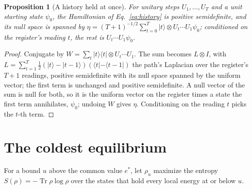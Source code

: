 \documentclass[aps,prd,reprint,superscriptaddress]{revtex4-2}
\newtheorem{proposition}{Proposition}
\begin{document}
\begin{proposition}[A history held at once]\label{prop:history}
For unitary steps $U_1, \dots, U_T$ and a unit starting state $\psi_0$, the Hamiltonian of Eq.~\eqref{eq:history} is positive semidefinite, and its null space is spanned by $\eta = (T+1)^{-1/2} \sum_{t=0}^{T} |t\rangle \otimes U_t \cdots U_1 \psi_0$; conditioned on the register's reading $t$, the rest is $U_t \cdots U_1 \psi_0$.
\end{proposition}
\begin{proof}
Conjugate by $W = \sum_t |t\rangle\langle t| \otimes U_t \cdots U_1$. The sum becomes $L \otimes I$, with $L = \sum_{t=1}^{T} \tfrac12 (|t\rangle - |t{-}1\rangle)(\langle t| - \langle t{-}1|)$ the path's Laplacian over the register's $T+1$ readings, positive semidefinite with its null space spanned by the uniform vector; the first term is unchanged and positive semidefinite. A null vector of the sum is null for both, so it is the uniform vector on the register times a state the first term annihilates, $\psi_0$; undoing $W$ gives $\eta$. Conditioning on the reading $t$ picks the $t$-th term.
\end{proof}

\section{The coldest equilibrium}
\label{app:coldest}

For a bound $u$ above the common value $e^*$, let $\rho_u$ maximize the entropy $S(\rho) = -\operatorname{Tr}\rho\log\rho$ over the states that hold every local energy at or below $u$.
\end{document}
